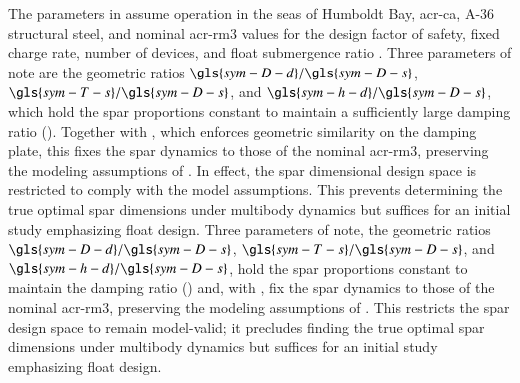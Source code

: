 The parameters in  assume operation in the seas of Humboldt Bay, \gls{acr-ca}, A-36 structural steel, and nominal \gls{acr-rm3} values for the design factor of safety, fixed charge rate, number of devices, and float submergence ratio \citep{RM3}.
\ifdefined\DISSERTATION
    Three parameters of note are the geometric ratios $\gls{sym-D-d}/\gls{sym-D-s}$, $\gls{sym-T-s}/\gls{sym-D-s}$, and $\gls{sym-h-d}/\gls{sym-D-s}$, which hold the spar proportions constant to maintain a sufficiently large damping ratio ().
    Together with , which enforces geometric similarity on the damping plate, this fixes the spar dynamics to those of the nominal \gls{acr-rm3}, preserving the modeling assumptions of \citet{mccabe_development_2026}.
    In effect, the spar dimensional design space is restricted to comply with the model assumptions.
    This prevents determining the true optimal spar dimensions under multibody dynamics but suffices for an initial study emphasizing float design.
\else
    Three parameters of note, the geometric ratios $\gls{sym-D-d}/\gls{sym-D-s}$, $\gls{sym-T-s}/\gls{sym-D-s}$, and $\gls{sym-h-d}/\gls{sym-D-s}$, hold the spar proportions constant to maintain the damping ratio () and, with , fix the spar dynamics to those of the nominal \gls{acr-rm3}, preserving the modeling assumptions of \citet{mccabe_development_2026}.
    This restricts the spar design space to remain model-valid; it precludes finding the true optimal spar dimensions under multibody dynamics but suffices for an initial study emphasizing float design.
\fi

